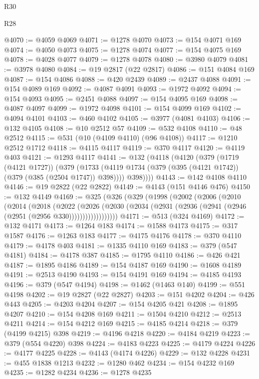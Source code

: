 \begin{lexlean}{R30}
\begin{lexlean}{R28}
\begin{coremodule}
{{{{{{{{{{{{{{{{{{{{{{{{{{{{{{{{{{{{{{{{{{{{{{{{{{{{{{{{{{{{{{{{{{{{{{{{{{{{{{{{{{{{{{{{{{{{{{{{{{{{{{{{{{{{{{{{{{{{{{{{{{{{{{{{{{{{{{{{{{{{{{{@4070 := @4059 @4069
@4071 := @1278 @4070
@4073 := @154 @4071 @169
@4074 := @4050 @4073
@4075 := @1278 @4074
@4077 := @154 @4075 @169
@4078 := @4028 @4077
@4079 := @1278 @4078
@4080 := @3980 @4079
@4081 := @3978 @4080
@4084 := @19 @2817 (@22 @2817)
@4086 := @151 @4084 @169
@4087 := @154 @4086
@4088 := @420 @2439
@4089 := @2437 @4088
@4091 := @154 @4089 @169
@4092 := @4087 @4091
@4093 := @1972 @4092
@4094 := @154 @4093
@4095 := @2451 @4088
@4097 := @154 @4095 @169
@4098 := @4087 @4097
@4099 := @1972 @4098
@4101 := @154 @4099 @169
@4102 := @4094 @4101
@4103 := @460 @4102
@4105 := @3977 (@4081 @4103)
@4106 := @132 @4105
@4108 := @10 @2512 @57
@4109 := @532 @4108
@4110 := @48 @2512
@4115 := @531 (@10 (@4109 @4110) (@96 @4108))
@4117 := @1210 @2512 @1712
@4118 := @4115 @4117
@4119 := @370 @4117
@4120 := @4119 @403
@4121 := @1293 @4117
@4141 := @132
    (@4118
      (@4120
        (@379
          (@1719 (@4121 @1727))
          (@379
            (@1733 (@4119 @1734 (@379 (@395 (@4121 @1742)) (@379 (@385 (@2504 @1747)) @398))))
            @398))))
@4143 := @142 @4108 @4110
@4146 := @19 @2822 (@22 @2822)
@4149 := @4143 (@151 @4146 @476)
@4150 := @132 @4149
@4169 := @325
    (@326
      (@329
        (@1998
          (@2002
            (@2006
              (@2010
                (@2014
                  (@2018
                    (@2022
                      (@2026
                        (@2030
                          (@2034 (@2931 (@2936 (@2941 (@2946 (@2951 (@2956 @330))))))))))))))))))
@4171 := @513 (@324 @4169)
@4172 := @132 @4171
@4173 := @1264 @183
@4174 := @1588 @4173
@4175 := @317 @1587
@4176 := @1263 @183
@4177 := @4175 @4176
@4178 := @370 @4110
@4179 := @4178 @403
@4181 := @1335 @4110 @169
@4183 := @379 (@547 @4181)
@4184 := @4178 @387
@4185 := @1795 @4110
@4186 := @426 @421
@4187 := @1895 @4186
@4189 := @154 @4187 @169
@4190 := @1608 @4189
@4191 := @2513 @4190
@4193 := @154 @4191 @169
@4194 := @4185 @4193
@4196 := @379 (@547 @4194)
@4198 := @1462 (@1463 @140)
@4199 := @551 @4198
@4202 := @19 @2827 (@22 @2827)
@4203 := @151 @4202
@4204 := @426 @443
@4205 := @4203 @4204
@4207 := @154 @4205 @421
@4208 := @1895 @4207
@4210 := @154 @4208 @169
@4211 := @1504 @4210
@4212 := @2513 @4211
@4214 := @154 @4212 @169
@4215 := @4185 @4214
@4218 := @379 (@4199 @4215) @398
@4219 := @4196 @4218
@4220 := @4184 @4219
@4223 := @379 (@554 @4220) @398
@4224 := @4183 @4223
@4225 := @4179 @4224
@4226 := @4177 @4225
@4228 := @4143 (@4174 @4226)
@4229 := @132 @4228
@4231 := @455 @1838 @1213
@4232 := @1280 @462
@4234 := @154 @4232 @169
@4235 := @1282 @4234
@4236 := @1278 @4235
}}}}}}}}}}}}}}}}}}}}}}}}}}}}}}}}}}}}}}}}}}}}}}}}}}}}}}}}}}}}}}}}}}}}}}}}}}}}}}}}}}}}}}}}}}}}}}}}}}}}}}}}}}}}}}}}}}}}}}}}}}}}}}}}}}}}}}}}}}}}}}}
\end{coremodule}
\end{lexlean}
\end{lexlean}

